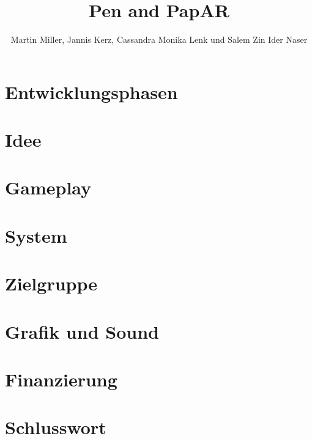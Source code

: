 \documentclass[11pt]{article}
\begin{document}
    \title{Pen and PapAR}
    \author{Martin Miller, Jannis Kerz, Cassandra Monika Lenk und Salem Zin Ider Naser}

    \maketitle
    \newpage

    \tableofcontents
    \newpage

    \section{Entwicklungsphasen}\label{sec:chapter_dev_process}
    

    \section{Idee}\label{sec:chapter_idea}
    

    \section{Gameplay}\label{sec:chapter_gameplay}
    

    \section{System}\label{sec:chapter_systems}
    

    \section{Zielgruppe}\label{sec:chapter_crowd}
    

    \section{Grafik und Sound}\label{sec:graphics/visuals}
    
    
    \section{Finanzierung}\label{sec:chapter_financials}
    

    \section{Schlusswort}\label{sec:chapter_finish}
    
\end{document}
